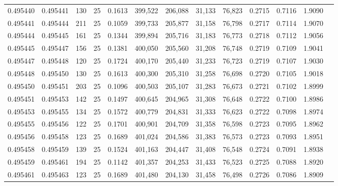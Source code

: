 \begin{tabular}{rrrrrrrrrrrrr}
0.495440 & 0.495441 &   130 &  25 &                                     0.1613 & 399,522 & 206,088 &  31,133 &  76,823 & 0.2715 & 0.7116 & 1.9090 \\
0.495441 & 0.495444 &   211 &  25 &                                     0.1059 & 399,733 & 205,877 &  31,158 &  76,798 & 0.2717 & 0.7114 & 1.9070 \\
0.495444 & 0.495445 &   161 &  25 &                                     0.1344 & 399,894 & 205,716 &  31,183 &  76,773 & 0.2718 & 0.7112 & 1.9056 \\
0.495445 & 0.495447 &   156 &  25 &                                     0.1381 & 400,050 & 205,560 &  31,208 &  76,748 & 0.2719 & 0.7109 & 1.9041 \\
0.495447 & 0.495448 &   120 &  25 &                                     0.1724 & 400,170 & 205,440 &  31,233 &  76,723 & 0.2719 & 0.7107 & 1.9030 \\
0.495448 & 0.495450 &   130 &  25 &                                     0.1613 & 400,300 & 205,310 &  31,258 &  76,698 & 0.2720 & 0.7105 & 1.9018 \\
0.495450 & 0.495451 &   203 &  25 &                                     0.1096 & 400,503 & 205,107 &  31,283 &  76,673 & 0.2721 & 0.7102 & 1.8999 \\
0.495451 & 0.495453 &   142 &  25 &                                     0.1497 & 400,645 & 204,965 &  31,308 &  76,648 & 0.2722 & 0.7100 & 1.8986 \\
0.495453 & 0.495455 &   134 &  25 &                                     0.1572 & 400,779 & 204,831 &  31,333 &  76,623 & 0.2722 & 0.7098 & 1.8974 \\
0.495455 & 0.495456 &   122 &  25 &                                     0.1701 & 400,901 & 204,709 &  31,358 &  76,598 & 0.2723 & 0.7095 & 1.8962 \\
0.495456 & 0.495458 &   123 &  25 &                                     0.1689 & 401,024 & 204,586 &  31,383 &  76,573 & 0.2723 & 0.7093 & 1.8951 \\
0.495458 & 0.495459 &   139 &  25 &                                     0.1524 & 401,163 & 204,447 &  31,408 &  76,548 & 0.2724 & 0.7091 & 1.8938 \\
0.495459 & 0.495461 &   194 &  25 &                                     0.1142 & 401,357 & 204,253 &  31,433 &  76,523 & 0.2725 & 0.7088 & 1.8920 \\
0.495461 & 0.495463 &   123 &  25 &                                     0.1689 & 401,480 & 204,130 &  31,458 &  76,498 & 0.2726 & 0.7086 & 1.8909 \\

\end{tabular}
